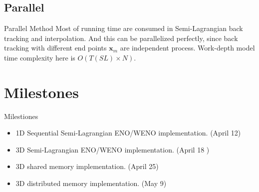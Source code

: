 \documentclass[xcolor=x11names,compress]{beamer}
\renewcommand{\(}{\begin{columns}}
\renewcommand{\)}{\end{columns}}
\newcommand{\<}[1]{\begin{column}{#1}}
\renewcommand{\>}{\end{column}}
\begin{document}
\subsection{Parallel}
\begin{frame}{Parallel Method}
Most of running time are consumed in Semi-Lagrangian back tracking and interpolation. And this can be parallelized perfectly, since back tracking with different end points $\mathbf{x}_m$ are independent process. Work-depth model time complexity here is $O(T(SL)\times N)$.
\end{frame}

\section{Milestones}
\begin{frame}{Milestiones}
\begin{itemize}
\item 1D Sequential Semi-Lagrangian ENO/WENO implementation. (April 12)
\item 3D Semi-Lagrangian ENO/WENO implementation. (April 18 )
\item 3D shared memory implementation. (April 25)
\item 3D distributed memory implementation. (May 9)
\end{itemize}
\end{frame}
\end{document}
